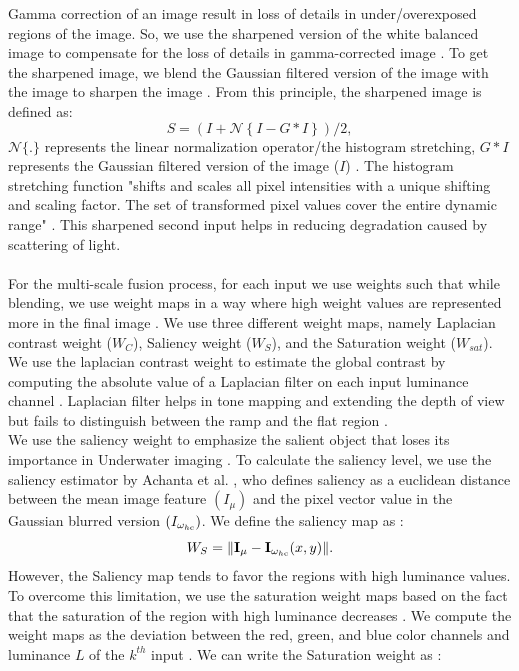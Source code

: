 \documentclass[a4paper,11pt,oneside]{article}
\begin{document}
  Gamma correction of an image result in loss of details in under/overexposed regions of the image. So, we use the sharpened version of the white balanced image to compensate for the loss of details in gamma-corrected image \cite{16}. To get the sharpened image, we blend the Gaussian filtered version of the image with the image to sharpen the image \cite{16}.  From this principle, the sharpened image is defined as:
  $$S = \left ({ I + \mathcal {N} \left \{{ I - G \ast I }\right \} }\right )/2,$$
  $\mathcal {N}\{.\}$ represents the linear normalization operator/the histogram stretching, $G \ast I$ represents the Gaussian filtered version of the image ($I$) \cite{16}. The histogram stretching function "shifts and scales all pixel intensities with a unique shifting and scaling factor. The set of transformed pixel values cover the entire dynamic range" \cite{16}. This sharpened second input helps in reducing degradation caused by scattering of light.\\
  \\
  For the multi-scale fusion process, for each input we use weights such that while blending, we use weight maps in a way where high weight values are represented more in the final image \cite{16}. We use three different weight maps, namely Laplacian contrast weight ($W_{C}$), Saliency weight ($W_{S}$), and the Saturation weight ($W_{sat}$).\\
  We use the laplacian contrast weight to estimate the global contrast by computing the absolute value of a Laplacian filter on each input luminance channel \cite{16}. Laplacian filter helps in tone mapping and extending the depth of view but fails to distinguish between the ramp and the flat region \cite{16}.\\
   We use the saliency weight to emphasize the salient object that loses its importance in Underwater imaging \cite{16}. To calculate the saliency level, we use the saliency estimator by Achanta et al. \cite{28}, who defines saliency as a euclidean distance between the mean image feature $(I_{\mu})$ and the pixel vector value in the Gaussian blurred version $(I_{\omega_{h{\rm c}}})$. We define the saliency map as \cite{28}:
   $$W_{S} =\Vert {\bf I}_{\mu}-{\bf I}_{\omega_{h{\rm c}}}(x, y)\Vert.$$
   However, the Saliency map tends to favor the regions with high luminance values. To overcome this limitation, we use the saturation weight maps based on the fact that the saturation of the region with high luminance decreases \cite{16}. We compute the weight maps as the deviation between the red, green, and blue color channels and luminance $L$ of the $k^{th}$ input \cite{16}. We can write the Saturation weight as \cite{16}:
\end{document}
